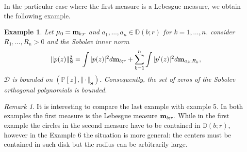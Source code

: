 \documentclass[12pt]{amsart}
\theoremstyle{definition}
\theoremstyle{plain}
\newtheorem{ejem}{Example}
\theoremstyle{remark}
\newtheorem{remark}{Remark}
\begin{document}
\noindent In the particular case where the first measure is a Lebesgue measure, we obtain the following example.
\begin{ejem} Let $\mu_0={\bf m}_{b;r}$ 
 and $a_1,\dots,a_n\in \mathbb{D}(b;r)$ for $k=1,\dots, n$.  consider $R_1,\dots, R_n>0$ and the Sobolev inner norm 
 $$
 \Vert p(z) \Vert^{2}_{\mathbf{S}} = \int \vert p(z) \vert^{2} d{\bf m}_{b;r}+ \sum_{k=1}^{n} \int \vert p'(z) \vert^{2} d{\bf m}_{a_k;R_k},
 $$
 \noindent $\mathcal{D}$ is bounded on $(\mathbb{P}[z], \Vert \cdot \Vert_{\mathbf{S}})$. Consequently, the set of zeros of the Sobolev orthogonal polynomials is bounded. 
\end{ejem}




\begin{center}
 


\end{center}
\begin{remark} It is interesting to compare the last example with example 5.  In both examples the first measure is the Lebesgue measure ${\bf m}_{b;r}$. While in the first example the circles in the second measure  have to be contained in $\mathbb{D}(b;r)$, however in the Example 6 the situation is more general: the centers must be  contained in such disk but the radius can be arbitrarily large. 
\end{remark}
\end{document}
